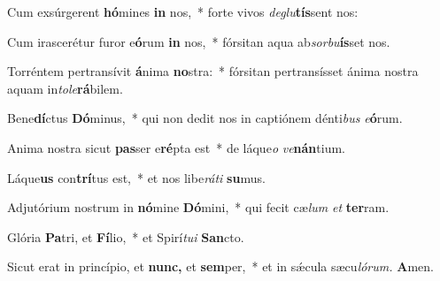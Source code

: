 \item Cum exsúrgerent \textbf{hó}mines \textbf{in} nos,~* forte vivos \textit{deglu}\textbf{tís}sent nos:
\item Cum irascerétur furor e\textbf{ó}rum \textbf{in} nos,~* fórsitan aqua ab\hspace{0.03em}\textit{sorbu}\textbf{ís}set nos.
\item Torréntem pertransívit \textbf{á}nima \textbf{no}stra:~* fórsitan pertransísset ánima nostra aquam in\hspace{0.03em}\textit{tole}\textbf{rá}bilem.
\item Bene\textbf{dí}ctus \textbf{Dó}minus,~* qui non dedit nos in captiónem dénti\textit{bus} \textit{e}\textbf{ó}rum.
\item Anima nostra sicut \textbf{pas}ser e\textbf{ré}pta est~* de láque\hspace{0.03em}\textit{o} \textit{ve}\textbf{nán}tium.
\item Láque\textbf{us} con\textbf{trí}tus est,~* et nos libe\hspace{0.03em}\textit{ráti} \textbf{su}mus.
\item Adjutórium nostrum in \textbf{nó}mine \textbf{Dó}mini,~* qui fecit cæ\hspace{0.03em}\textit{lum} \textit{et} \textbf{ter}ram.
\item Glória \textbf{Pa}tri, et \textbf{Fí}lio,~* et Spirí\hspace{0.03em}\textit{tui} \textbf{San}cto.
\item Sicut erat in princípio, et \textbf{nunc,} et \textbf{sem}per,~* et in sǽcula sæcu\textit{lórum.} \textbf{A}men.